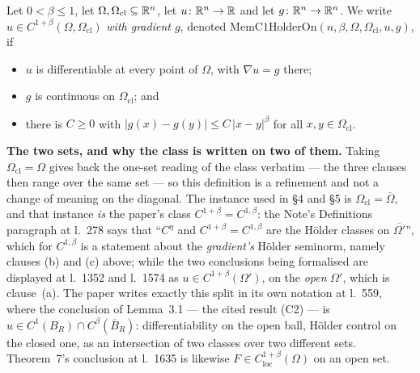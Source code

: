 \begin{definition}
Let $0<\beta\le1$, let $\Omega,\Omega_{\mathrm{cl}}\subseteq\mathbb{R}^n$, let
$u\colon\mathbb{R}^n\to\mathbb{R}$ and let $g\colon\mathbb{R}^n\to\mathbb{R}^n$.  We write
$u\in C^{1+\beta}(\Omega,\Omega_{\mathrm{cl}})$ \emph{with gradient $g$},
denoted
$\mathrm{MemC1HolderOn}(n,\beta,\Omega,\Omega_{\mathrm{cl}},u,g)$, if
\begin{itemize}
\item[(a)] $u$ is differentiable at every point of $\Omega$, with
  $\nabla u=g$ there;
\item[(b)] $g$ is continuous on $\Omega_{\mathrm{cl}}$; and
\item[(c)] there is $C\ge0$ with
  $|g(x)-g(y)|\le C\,|x-y|^{\beta}$ for all
  $x,y\in\Omega_{\mathrm{cl}}$.
\end{itemize}

\noindent\textbf{The two sets, and why the class is written on two of them.}
Taking $\Omega_{\mathrm{cl}}=\Omega$ gives back the one-set reading of the class
verbatim --- the three clauses then range over the same set --- so this
definition is a refinement and not a change of meaning on the diagonal.  The
instance used in \S4 and \S5 is $\Omega_{\mathrm{cl}}=\overline{\Omega}$, and
that instance \emph{is} the paper's class $C^{1+\beta}=C^{1,\beta}$: the Note's
Definitions paragraph at l.~278 says that ``$C^{\eta}$ and
$C^{1+\beta}=C^{1,\beta}$ are the H\"older classes on $\overline{\Omega'}$'',
which for $C^{1,\beta}$ is a statement about the \emph{gradient's} H\"older
seminorm, namely clauses (b) and (c) above; while the two conclusions being
formalised are displayed at l.~1352 and l.~1574 as
$u\in C^{1+\beta}(\Omega')$, on the \emph{open} $\Omega'$, which is clause~(a).
The paper writes exactly this split in its own notation at l.~559, where the
conclusion of Lemma~3.1 --- the cited result (C2) --- is
$u\in C^{1}(B_R)\cap C^{\beta}(\overline B_R)$: differentiability on the open
ball, H\"older control on the closed one, as an intersection of two classes over
two different sets.  Theorem~7's conclusion at l.~1635 is likewise
$F\in C^{1+\beta}_{\mathrm{loc}}(\Omega)$ on an open set.


\end{definition}
